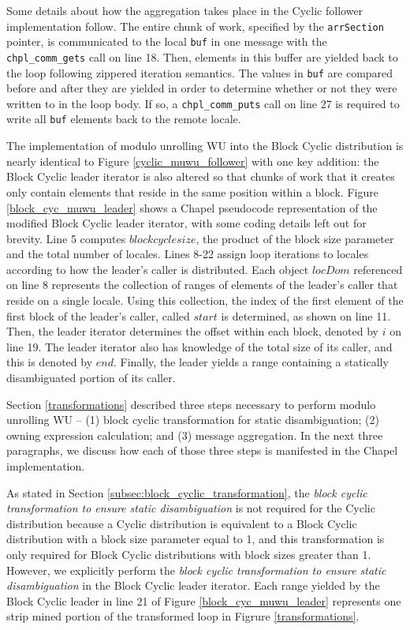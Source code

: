 Some details about how the aggregation takes place in the Cyclic follower implementation follow. The entire chunk of work, specified by the \texttt{arrSection} pointer, is communicated to the local \texttt{buf} in one message with the \texttt{chpl\_comm\_gets} call on line 18. Then, elements in this buffer are yielded back to the loop following zippered iteration semantics. The values in \texttt{buf} are compared before and after they are yielded in order to determine whether or not they were written to in the loop body. If so, a \texttt{chpl\_comm\_puts} call on line 27 is required to write all \texttt{buf} elements back to the remote locale.

The implementation of modulo unrolling WU into the Block Cyclic distribution is nearly identical to Figure \ref{cyclic_muwu_follower} with one key addition: the Block Cyclic leader iterator is also altered so that chunks of work that it creates only contain elements that reside in the same position within a block. 
Figure \ref{block_cyc_muwu_leader} shows a Chapel pseudocode representation of the modified Block Cyclic leader iterator, with some coding details left out for brevity. Line 5 computes $blockcyclesize$, the product of the block size parameter and the total number of locales. Lines 8-22 assign loop iterations to locales according to how the leader's caller is distributed. Each object $locDom$ referenced on line 8 represents the collection of ranges of elements of the leader's caller that reside on a single locale. Using this collection, the index of the first element of the first block of the leader's caller, called $start$ is determined, as shown on line 11. Then, the leader iterator determines the offset within each block, denoted by $i$ on line 19. The leader iterator also has knowledge of the total size of its caller, and this is denoted by $end$. Finally, the leader yields a range containing a statically disambiguated portion of its caller. 

Section \ref{transformations} described three steps necessary to perform modulo unrolling WU -- (1) block cyclic transformation for static disambiguation; (2) owning expression calculation; and (3) message aggregation. In the next three paragraphs, we discuss how each of those three steps is manifested in the Chapel implementation. 

As stated in Section \ref{subsec:block_cyclic_transformation}, the \textit{block cyclic transformation to ensure static disambiguation} is not required for the Cyclic distribution because a Cyclic distribution is equivalent to a Block Cyclic distribution with a block size parameter equal to 1, and this transformation is only required for Block Cyclic distributions with block sizes greater than 1. However, we explicitly perform the \textit{block cyclic transformation to ensure static disambiguation} in the Block Cyclic leader iterator. Each range yielded by the Block Cyclic leader in line 21 of Figure \ref{block_cyc_muwu_leader} represents one strip mined portion of the transformed loop in Figrure \ref{transformations}.

